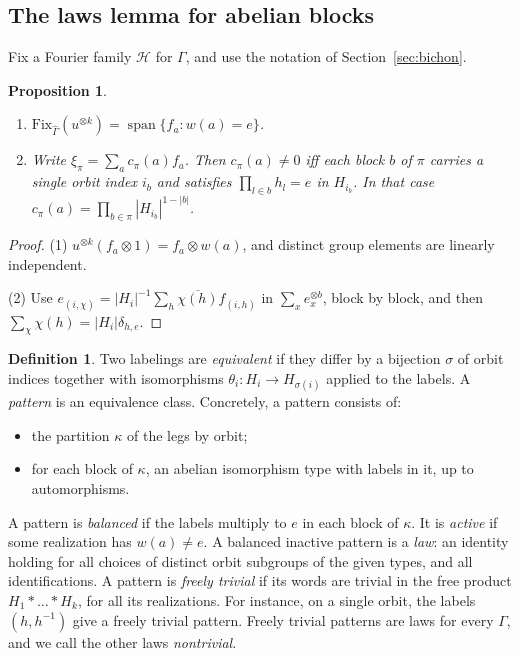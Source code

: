 \documentclass[11pt]{amsart}
\newtheorem{proposition}[theorem]{Proposition}
\theoremstyle{definition}
\newtheorem{definition}[theorem]{Definition}
\theoremstyle{remark}
\theoremstyle{plain}
\numberwithin{equation}{section}
\numberwithin{table}{section}
\newcommand{\Fix}{\mathrm{Fix}}
\DeclareMathOperator{\spn}{span}
\begin{document}
\subsection{The laws lemma for abelian blocks}\label{sec:laws}

Fix a Fourier family $\mathcal H$ for $\Gamma$, and use the notation of Section~\ref{sec:bichon}.

\begin{proposition}\label{prop:coords}
\begin{enumerate}
\item $\Fix_{\widehat\Gamma}(u^{\otimes k})=\spn\{f_a:w(a)=e\}$.
\item Write $\xi_\pi=\sum_ac_\pi(a)f_a$. Then $c_\pi(a)\ne0$ iff each block $b$ of $\pi$ carries a single orbit index $i_b$ and satisfies $\prod_{l\in b}h_l=e$ in $H_{i_b}$. In that case $c_\pi(a)=\prod_{b\in\pi}|H_{i_b}|^{1-|b|}$.
\end{enumerate}
\end{proposition}

\begin{proof}
(1) $u^{\otimes k}(f_a\otimes1)=f_a\otimes w(a)$, and distinct group elements are linearly independent.

(2) Use $e_{(i,\chi)}=|H_i|^{-1}\sum_h\overline{\chi(h)}f_{(i,h)}$ in $\sum_xe_x^{\otimes b}$, block by block, and then $\sum_\chi\chi(h)=|H_i|\delta_{h,e}$.
\end{proof}

\begin{definition}
Two labelings are \emph{equivalent} if they differ by a bijection $\sigma$ of orbit indices together with isomorphisms $\theta_i:H_i\to H_{\sigma(i)}$ applied to the labels. A \emph{pattern} is an equivalence class. Concretely, a pattern consists of:
\begin{itemize}
\item the partition $\kappa$ of the legs by orbit;
\item for each block of $\kappa$, an abelian isomorphism type with labels in it, up to automorphisms.
\end{itemize}
A pattern is \emph{balanced} if the labels multiply to $e$ in each block of $\kappa$. It is \emph{active} if some realization has $w(a)\ne e$. A balanced inactive pattern is a \emph{law}: an identity holding for all choices of distinct orbit subgroups of the given types, and all identifications. A pattern is \emph{freely trivial} if its words are trivial in the free product $H_1*\dots*H_k$, for all its realizations. For instance, on a single orbit, the labels $(h,h^{-1})$ give a freely trivial pattern. Freely trivial patterns are laws for every $\Gamma$, and we call the other laws \emph{nontrivial}.
\end{definition}
\end{document}
